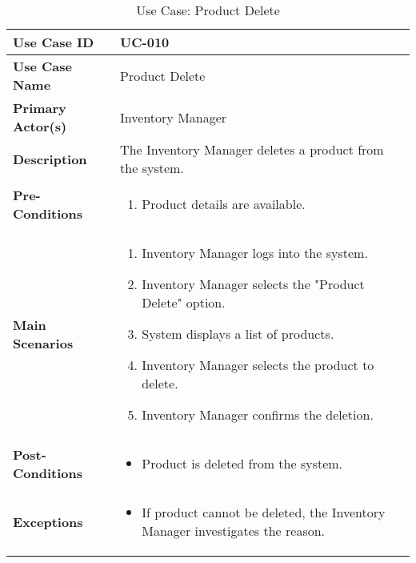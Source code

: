 \documentclass{article}
\begin{document}
\begin{table}[!ht]
    \centering
    \renewcommand{\arraystretch}{1.3}
    \begin{tabularx}{\textwidth}{|l|X|}
        \hline
        \textbf{Use Case ID} & UC-010 \\
        \hline
        \textbf{Use Case Name} & Product Delete \\
        \hline
        \textbf{Primary Actor(s)} & Inventory Manager \\
        \hline
        \textbf{Description} & The Inventory Manager deletes a product from the system. \\
        \hline
        \textbf{Pre-Conditions} & 
        \begin{enumerate}[label=\arabic*.,itemsep=0pt]
            \item Product details are available.
        \end{enumerate} \\
        \hline
        \textbf{Main Scenarios} & 
        \begin{enumerate}[label=\arabic*.,itemsep=0pt]
            \item Inventory Manager logs into the system.
            \item Inventory Manager selects the "Product Delete" option.
            \item System displays a list of products.
            \item Inventory Manager selects the product to delete.
            \item Inventory Manager confirms the deletion.
        \end{enumerate} \\
        \hline
        \textbf{Post-Conditions} & 
        \begin{itemize}[label=--,itemsep=0pt]
            \item Product is deleted from the system.
        \end{itemize} \\
        \hline
        \textbf{Exceptions} & 
        \begin{itemize}[label=--,itemsep=0pt]
            \item If product cannot be deleted, the Inventory Manager investigates the reason.
        \end{itemize} \\
        \hline
    \end{tabularx}
    \caption{Use Case: Product Delete}
    \label{tab:use-case-product-delete}
\end{table}
\end{document}
